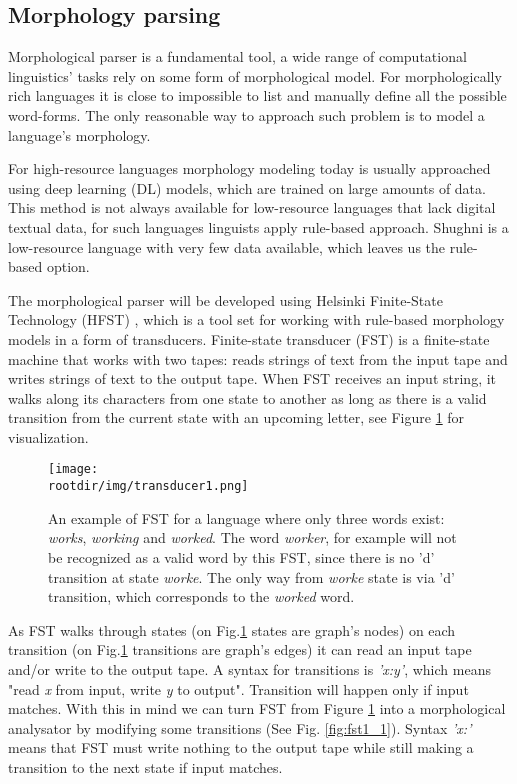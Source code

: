 \subsection{Morphology parsing}
\par Morphological parser is a fundamental tool, a wide range of computational linguistics' tasks rely on some form of morphological model. For morphologically rich languages it is close to impossible to list and manually define all the possible word-forms. The only reasonable way to approach such problem is to model a language's morphology. 
\par For high-resource languages morphology modeling today is usually approached using deep learning (DL) models, which are trained on large amounts of data. This method is not always available for low-resource languages that lack digital textual data, for such languages linguists apply rule-based approach. Shughni is a low-resource language with very few data available, which leaves us the rule-based option.
\par The morphological parser will be developed using Helsinki Finite-State Technology (HFST) \parencite{linden_hfst_2009}, which is a tool set for working with rule-based morphology models in a form of transducers. Finite-state transducer (FST) is a finite-state machine that works with two tapes: reads strings of text from the input tape and writes strings of text to the output tape. When FST receives an input string, it walks along its characters from one state to another as long as there is a valid transition from the current state with an upcoming letter, see Figure \ref{fig:fst1} for visualization.
\begin{figure}[!ht]
    \centering
    \texttt{[image: \\rootdir/img/transducer1.png]}
    \caption{An example of FST for a language where only three words exist: \textit{works}, \textit{working} and \textit{worked}. The word \textit{worker}, for example will not be recognized as a valid word by this FST, since there is no 'd' transition at state \textit{worke}. The only way from \textit{worke} state is via 'd' transition, which corresponds to the \textit{worked} word. \parencite{beesley_fst_2002}}
    \label{fig:fst1}
\end{figure}
\par As FST walks through states (on Fig.\ref{fig:fst1} states are graph's nodes) on each transition (on Fig.\ref{fig:fst1} transitions are graph's edges) it can read an input tape and/or write to the output tape. A syntax for transitions is \textit{'x:y'}, which means "read \textit{x} from input, write \textit{y} to output". Transition will happen only if input matches. With this in mind we can turn FST from Figure \ref{fig:fst1} into a morphological analysator by modifying some transitions (See Fig. \ref{fig:fst1_1}). Syntax \textit{'x:'} means that FST must write nothing to the output tape while still making a transition to the next state if input matches.

